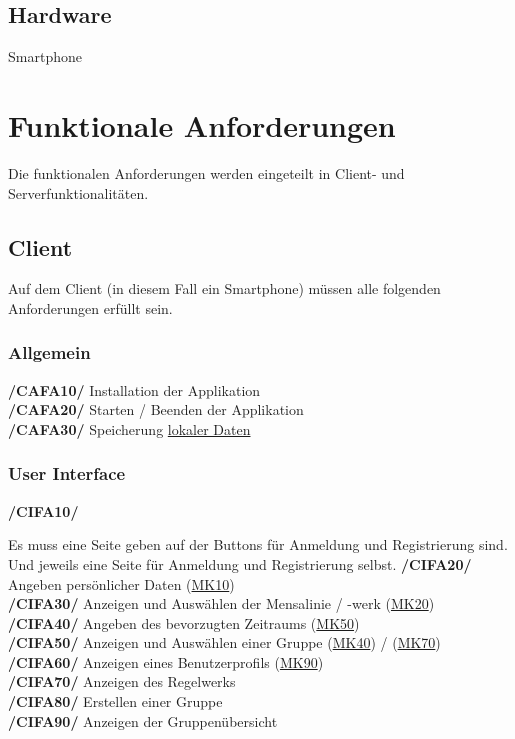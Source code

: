 \documentclass[a4paper]{scrreprt}
\begin{document}
\section{Hardware}
Smartphone

\chapter{Funktionale Anforderungen}
Die funktionalen Anforderungen werden eingeteilt in Client- und Serverfunktionalitäten.

\section{Client}
Auf dem Client (in diesem Fall ein Smartphone) müssen alle folgenden Anforderungen erfüllt sein.

\subsection{Allgemein}

\begin{addmargin}[25pt]{0pt}
\textbf{/CAFA10/} Installation der Applikation \\
\textbf{/CAFA20/} Starten / Beenden der Applikation\\
\textbf{/CAFA30/} Speicherung \hyperlink{label4}{lokaler Daten}\\
\end{addmargin}

\subsection{User Interface}

\begin{addmargin}[25pt]{0pt}
\hypertarget{cifa10}{\textbf{/CIFA10/}} Es muss eine Seite geben auf der Buttons für Anmeldung und Registrierung sind. Und jeweils eine Seite für Anmeldung und Registrierung selbst.
\hypertarget{cifa20}{\textbf{/CIFA20/}} Angeben persönlicher Daten (\hyperlink{mk10}{MK10})\\
\hypertarget{cifa30}{\textbf{/CIFA30/}} Anzeigen und Auswählen der Mensalinie / -werk (\hyperlink{mk20}{MK20})\\
\hypertarget{cifa40}{\textbf{/CIFA40/}} Angeben des bevorzugten Zeitraums (\hyperlink{mk50}{MK50})\\
\hypertarget{cifa50}{\textbf{/CIFA50/}} Anzeigen und Auswählen einer Gruppe (\hyperlink{m40}{MK40}) / (\hyperlink{mk70}{MK70})\\
\hypertarget{cifa60}{\textbf{/CIFA60/}} Anzeigen eines Benutzerprofils (\hyperlink{mk90}{MK90})\\
\hypertarget{cifa70}{\textbf{/CIFA70/}} Anzeigen des Regelwerks\\
\hypertarget{cifa80}{\textbf{/CIFA80/}} Erstellen einer Gruppe\\
\hypertarget{cifa90}{\textbf{/CIFA90/}} Anzeigen der Gruppenübersicht\\
\end{addmargin}
\end{document}
